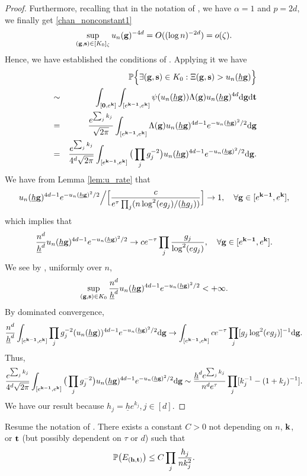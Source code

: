 \documentclass[twoside,11pt]{article}
\begin{document}
\begin{proof}
Furthermore, recalling that in the notation of , we have $\alpha = 1$ and $p = 2d$, we finally get \eqref{chan_nonconstant1}
\[
\sup_{(\mathbf{g},\mathbf{s}) \in [K_0]_{\zeta}} u_n(\mathbf{g})^{-4d} = O((\log n)^{-2d}) = o(\zeta).
\]
Hence, we have established the conditions of .
Applying it we have 
\begin{eqnarray*}
&&\mathbb{P} \Big\{ \exists (\mathbf{g},\mathbf{s}) \in K_0 : \Xi(\mathbf{g},\mathbf{s}) > u_n(\underline h \mathbf{g}) \Big\}\\
& \sim &\int_{[{\bf 0},e^{\mathbf{k}}]} \int_{[e^{\mathbf{k} - {\bf 1}},e^{\mathbf{k}}]} \psi(u_n(\underline h \mathbf{g})) \Lambda(\mathbf{g}) u_n(\underline h \mathbf{g})^{4d} {\rm d} \mathbf{g} {\rm d} \mathbf{t} \\
&= &\frac{e^{\sum_j k_j}}{\sqrt{2\pi}} \int_{[e^{\mathbf{k} - {\bf 1}},e^{\mathbf{k}}]} \Lambda(\mathbf{g}) u_n(\underline h \mathbf{g})^{4d - 1} e^{-u_n(\underline h \mathbf{g})^2 / 2} {\rm d} \mathbf{g}\\
&= &\frac{e^{\sum_j k_j}}{4^d \sqrt{2\pi}} \int_{[e^{\mathbf{k} - {\bf 1}},e^{\mathbf{k}}]} \big(\prod_j g_j^{-2}\big) u_n(\underline h \mathbf{g})^{4d - 1} e^{-u_n(\underline h \mathbf{g})^2 / 2} {\rm d} \mathbf{g}.\\
\end{eqnarray*}
We have from Lemma \ref{lem:u_rate} that 
\[
u_n(\underline h \mathbf{g})^{4d - 1} e^{-u_n(\underline h \mathbf{g})^2 / 2} \Big/ \Big[ \frac{c}{e^\tau \prod_j (n \log^2 (e g_j) / (\underline h g_j))} \Big] \rightarrow 1, \quad \forall \mathbf{g} \in [e^{\mathbf{k} - {\bf 1}},e^{\mathbf{k}}],
\]
which implies that 
\[
\frac{n^d}{\underline h^d} u_n(\underline h \mathbf{g})^{4d - 1} e^{-u_n(\underline h \mathbf{g})^2 / 2}  \rightarrow c e^{-\tau} \prod_j \frac{g_j}{\log^2(e g_j)}  , \quad \forall \mathbf{g} \in [e^{\mathbf{k} - {\bf 1}},e^{\mathbf{k}}].
\]
We see by , uniformly over $n$,
\[
\sup_{(\mathbf{g},\mathbf{s}) \in K_0} \frac{n^d}{\underline h^d} u_n(\underline h \mathbf{g})^{4d - 1} e^{-u_n(\underline h \mathbf{g})^2 / 2} < + \infty.
\]
By dominated convergence,
\[
\frac{n^d}{\underline h^d} \int_{[e^{\mathbf{k} - {\bf 1}},e^{\mathbf{k}}]}  \prod_j g_j^{-2} (u_n(\underline h \mathbf{g}))^{4d - 1} e^{-u_n(\underline h \mathbf{g})^2 / 2} {\rm d} \mathbf{g} \rightarrow \int_{[e^{\mathbf{k} - {\bf 1}},e^{\mathbf{k}}]} c e^{-\tau} \prod_j [g_j \log^2(e g_j)]^{-1} {\rm d} \mathbf{g}.
\]
Thus,
\[
\frac{e^{\sum_j k_j}}{4^d \sqrt{2\pi}} \int_{[e^{\mathbf{k} - {\bf 1}},e^{\mathbf{k}}]} \big(\prod_j g_j^{-2}\big) u_n(\underline h \mathbf{g})^{4d - 1} e^{-u_n(\underline h \mathbf{g})^2 / 2} {\rm d} \mathbf{g} \sim 
\frac{\underline h^d e^{\sum_j k_j}}{n^d e^\tau} \prod_j [k_j^{-1} - (1 + k_j)^{-1}].
\]
We have our result because $h_j = \underline h e^{k_j}, j \in [d]$.
\end{proof}


\begin{lemma}
\label{lem:nonconstant_bound}
Resume the notation of .
There exists a constant $C > 0$ not depending on $n$, $\mathbf{k}$, or $\mathbf{t}$ (but possibly dependent on $\tau$ or $d$) such that
\[
\mathbb{P} \big( E_{(\mathbf{h},\mathbf{t})} \big) \le C \prod_j \frac{h_j}{n k_j^2}.
\]
\end{lemma}
\end{document}
